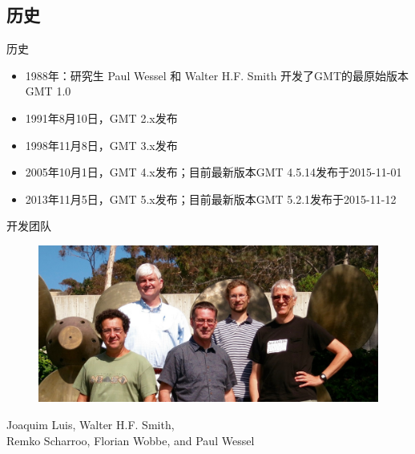 \documentclass[UTF8, 11pt]{ctexbeamer}
\begin{document}
\subsection{历史}
\begin{frame}{历史}
\begin{itemize}
\item 1988年：研究生 Paul Wessel 和 Walter H.F. Smith 开发了GMT的最原始版本GMT 1.0
\item 1991年8月10日，GMT 2.x发布
\item 1998年11月8日，GMT 3.x发布
\item 2005年10月1日，GMT 4.x发布；目前最新版本GMT 4.5.14发布于2015-11-01
\item 2013年11月5日，GMT 5.x发布；目前最新版本GMT 5.2.1发布于2015-11-12
\end{itemize}
\end{frame}

\begin{frame}{开发团队}
\centering
\begin{figure}
\includegraphics[width=\textwidth]{GMT5_Summit_2016.jpg}
\end{figure}
Joaquim Luis, Walter H.F. Smith, \\
Remko Scharroo, Florian Wobbe, and Paul Wessel
\end{frame}
\end{document}
